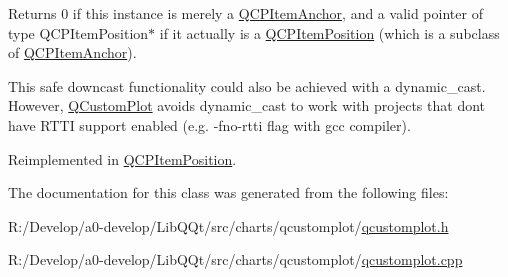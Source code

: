 Returns 0 if this instance is merely a \mbox{\hyperlink{class_q_c_p_item_anchor}{Q\+C\+P\+Item\+Anchor}}, and a valid pointer of type Q\+C\+P\+Item\+Position$\ast$ if it actually is a \mbox{\hyperlink{class_q_c_p_item_position}{Q\+C\+P\+Item\+Position}} (which is a subclass of \mbox{\hyperlink{class_q_c_p_item_anchor}{Q\+C\+P\+Item\+Anchor}}).

This safe downcast functionality could also be achieved with a dynamic\+\_\+cast. However, \mbox{\hyperlink{class_q_custom_plot}{Q\+Custom\+Plot}} avoids dynamic\+\_\+cast to work with projects that don\textquotesingle{}t have R\+T\+TI support enabled (e.\+g. -\/fno-\/rtti flag with gcc compiler). 

Reimplemented in \mbox{\hyperlink{class_q_c_p_item_position_a577a7efc601df85a20b3e709d1ac320e}{Q\+C\+P\+Item\+Position}}.



The documentation for this class was generated from the following files\+:\begin{DoxyCompactItemize}
\item 
R\+:/\+Develop/a0-\/develop/\+Lib\+Q\+Qt/src/charts/qcustomplot/\mbox{\hyperlink{qcustomplot_8h}{qcustomplot.\+h}}\item 
R\+:/\+Develop/a0-\/develop/\+Lib\+Q\+Qt/src/charts/qcustomplot/\mbox{\hyperlink{qcustomplot_8cpp}{qcustomplot.\+cpp}}\end{DoxyCompactItemize}
